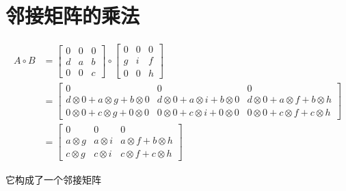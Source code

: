 \documentclass[10pt, openany]{book}
\begin{document}
\section{邻接矩阵的乘法}

\begin{equation}
\begin{aligned}
A \circ B &= 
\begin{bmatrix}
0 & 0 & 0 \\
d & a & b \\
0 & 0 & c
\end{bmatrix} 
\circ
\begin{bmatrix}
0 & 0 & 0 \\
g & i & f \\
0 & 0 & h
\end{bmatrix} \\
&= \begin{bmatrix}
0 & 0 & 0 \\
d \otimes 0 + a \otimes g + b \otimes 0 & d \otimes 0 + a \otimes i + b \otimes 0 & d \otimes 0 + a \otimes f + b \otimes h \\
0 \otimes 0 + c \otimes g + 0 \otimes 0 & 0 \otimes 0 + c \otimes i + 0 \otimes 0 & 0 \otimes 0 + c \otimes f + c \otimes h
\end{bmatrix} \\
&= \begin{bmatrix}
0 & 0 & 0 \\
a \otimes g & a \otimes i & a \otimes f + b \otimes h \\
c \otimes g & c \otimes i & c \otimes f + c \otimes h
\end{bmatrix}
\end{aligned}
\end{equation}

它构成了一个邻接矩阵
\end{document}
